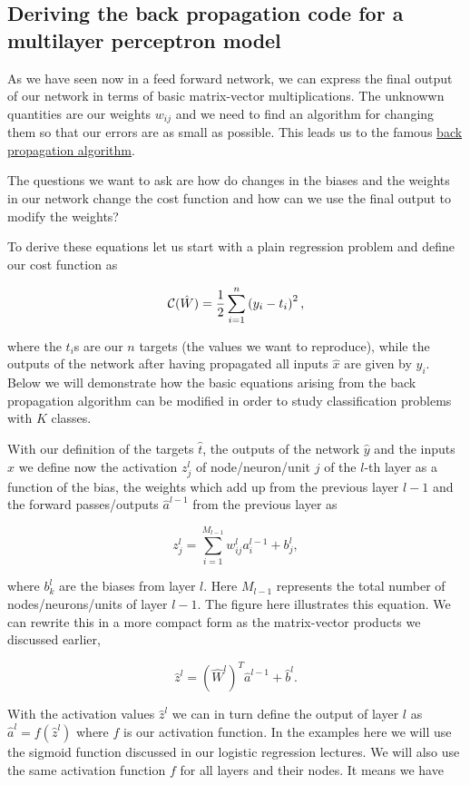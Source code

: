 \documentclass[%
oneside,                 %
final,                   %
10pt]{article}
\begin{document}
\subsection{Deriving the back propagation code for a multilayer perceptron model}

As we have seen now in a feed forward network, we can express the final output of our network in terms of basic matrix-vector multiplications.
The unknowwn quantities are our weights $w_{ij}$ and we need to find an algorithm for changing them so that our errors are as small as possible.
This leads us to the famous \href{{https://www.nature.com/articles/323533a0}}{back propagation algorithm}.

The questions we want to ask are how do changes in the biases and the
weights in our network change the cost function and how can we use the
final output to modify the weights?

To derive these equations let us start with a plain regression problem
and define our cost function as

\[
{\cal C}(\hat{W})  =  \frac{1}{2}\sum_{i=1}^n\left(y_i - t_i\right)^2, 
\]

where the $t_i$s are our $n$ targets (the values we want to
reproduce), while the outputs of the network after having propagated
all inputs $\hat{x}$ are given by $y_i$.  Below we will demonstrate
how the basic equations arising from the back propagation algorithm
can be modified in order to study classification problems with $K$
classes.

With our definition of the targets $\hat{t}$, the outputs of the
network $\hat{y}$ and the inputs $\hat{x}$ we
define now the activation $z_j^l$ of node/neuron/unit $j$ of the
$l$-th layer as a function of the bias, the weights which add up from
the previous layer $l-1$ and the forward passes/outputs
$\hat{a}^{l-1}$ from the previous layer as


\[
z_j^l = \sum_{i=1}^{M_{l-1}}w_{ij}^la_i^{l-1}+b_j^l,
\]

where $b_k^l$ are the biases from layer $l$.  Here $M_{l-1}$
represents the total number of nodes/neurons/units of layer $l-1$. The
figure here illustrates this equation.  We can rewrite this in a more
compact form as the matrix-vector products we discussed earlier,

\[
\hat{z}^l = \left(\hat{W}^l\right)^T\hat{a}^{l-1}+\hat{b}^l.
\]

With the activation values $\hat{z}^l$ we can in turn define the
output of layer $l$ as $\hat{a}^l = f(\hat{z}^l)$ where $f$ is our
activation function. In the examples here we will use the sigmoid
function discussed in our logistic regression lectures. We will also use the same activation function $f$ for all layers
and their nodes.  It means we have
\end{document}
